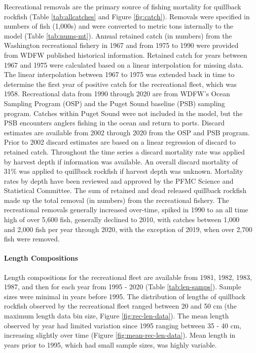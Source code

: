 \documentclass[11pt,
  english,
  letterpaper,
]{article}
\begin{document}
Recreational removals are the primary source of fishing mortality for quillback rockfish (Table \ref{tab:allcatches} and Figure \ref{fig:catch}). Removals were specified in numbers of fish (1,000s) and were converted to metric tons internally to the model (Table \ref{tab:nums-mt}). Annual retained catch (in numbers) from the Washington recreational fishery in 1967 and from 1975 to 1990 were provided from WDFW published historical information. Retained catch for years between 1967 and 1975 were calculated based on a linear interpolation for missing data. The linear interpolation between 1967 to 1975 was extended back in time to determine the first year of positive catch for the recreational fleet, which was 1958. Recreational data from 1990 through 2020 are from WDFW's Ocean Sampling Program (OSP) and the Puget Sound baseline (PSB) sampling program. Catches within Puget Sound were not included in the model, but the PSB encounters anglers fishing in the ocean and return to ports. Discard estimates are available from 2002 through 2020 from the OSP and PSB program. Prior to 2002 discard estimates are based on a linear regression of discard to retained catch. Throughout the time series a discard mortality rate was applied by harvest depth if information was available. An overall discard mortality of 31\% was applied to quillback rockfish if harvest depth was unknown. Mortality rates by depth have been reviewed and approved by the PFMC Science and Statistical Committee. The sum of retained and dead released quillback rockfish made up the total removal (in numbers) from the recreational fishery. The recreational removals generally increased over-time, spiked in 1990 to an all time high of over 5,600 fish, generally declined to 2010, with catches between 1,000 and 2,000 fish per year through 2020, with the exception of 2019, when over 2,700 fish were removed.

\leavevmode\tagmcend\tagstructend\par


\hypertarget{length-compositions-1}{%
\paragraph{Length Compositions}\label{length-compositions-1}}

\leavevmode\tagmcend\tagstructend


Length compositions for the recreational fleet are available from 1981, 1982, 1983, 1987, and then for each year from 1995 - 2020 (Table \ref{tab:len-samps}). Sample sizes were minimal in years before 1995. The distribution of lengths of quillback rockfish observed by the recreational fleet ranged between 20 and 50 cm (the maximum length data bin size, Figure \ref{fig:rec-len-data}). The mean length observed by year had limited variation since 1995 ranging between 35 - 40 cm, increasing slightly over time (Figure \ref{fig:mean-rec-len-data}). Mean length in years prior to 1995, which had small sample sizes, was highly variable.
\end{document}

